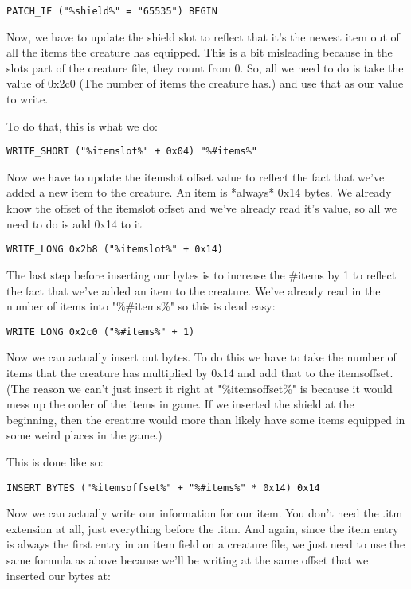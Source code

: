 \documentclass{article}
\begin{document}
\begin{verbatim}
PATCH_IF ("%shield%" = "65535") BEGIN
\end{verbatim}

Now, we have to update the shield slot to reflect that it's the newest item
out of all the items the creature has equipped.  This is a bit misleading
because in the slots part of the creature file, they count from 0.  So, all
we need to do is take the value of 0x2c0 (The number of items the creature
has.) and use that as our value to write.

To do that, this is what we do:

\begin{verbatim}
WRITE_SHORT ("%itemslot%" + 0x04) "%#items%"
\end{verbatim}

Now we have to update the itemslot offset value to reflect the fact that
we've added a new item to the creature.  An item is *always* 0x14 bytes.
We already know the offset of the itemslot offset and we've already read
it's value, so all we need to do is add 0x14 to it

\begin{verbatim}
WRITE_LONG 0x2b8 ("%itemslot%" + 0x14)
\end{verbatim}

The last step before inserting our bytes is to increase the \#items by 1 to
reflect the fact that we've added an item to the creature.  We've already
read in the number of items into "\%\#items\%" so this is dead easy:

\begin{verbatim}
WRITE_LONG 0x2c0 ("%#items%" + 1)
\end{verbatim}

Now we can actually insert out bytes.  To do this we have to take the
number of items that the creature has multiplied by 0x14 and add that to
the itemsoffset.  (The reason we can't just insert it right at
"\%itemsoffset\%" is because it would mess up the order of the items in game.
If we inserted the shield at the beginning, then the creature would more
than likely have some items equipped in some weird places in the game.)

This is done like so:

\begin{verbatim}
INSERT_BYTES ("%itemsoffset%" + "%#items%" * 0x14) 0x14
\end{verbatim}

Now we can actually write our information for our item.  You don't need the
.itm extension at all, just everything before the .itm.  And again, since
the item entry is always the first entry in an item field on a creature
file, we just need to use the same formula as above because we'll be
writing at the same offset that we inserted our bytes at:
\end{document}
